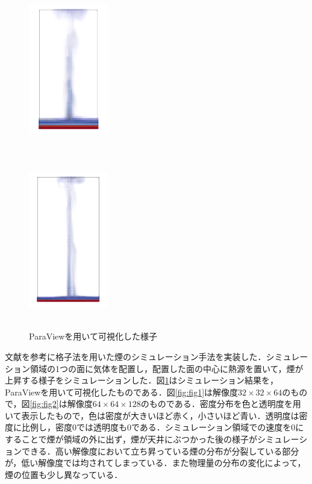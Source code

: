 \documentclass[10pt,a4paper,notitlepage,oneside,twocolumn]{abst_jsarticle}
\begin{document}
\begin{figure}[h]
\begin{minipage}[t]{0.5\linewidth}
  \includegraphics[height=7cm,width=3.5cm]{323264.png}
  \subcaption{}
  \label{fig:fig1}
  \end{minipage}
  \begin{minipage}[t]{0.4\linewidth}
  \includegraphics[height=7cm,width=3.5cm]{6464128.png}
  \subcaption{}
  \label{fig:fig2}
  \end{minipage}
\caption{ParaViewを用いて可視化した様子}
\label{fig}
\end{figure}
文献\cite{fedkiw}を参考に格子法を用いた煙のシミュレーション手法を実装した．シミュレーション領域の1つの面に気体を配置し，配置した面の中心に熱源を置いて，煙が上昇する様子をシミュレーションした．図\ref{fig}はシミュレーション結果を，ParaViewを用いて可視化したものである．図\ref{fig:fig1}は解像度$32\times32\times64$のもので，図\ref{fig:fig2}は解像度$64\times64\times128$のものである．密度分布を色と透明度を用いて表示したもので，色は密度が大きいほど赤く，小さいほど青い．透明度は密度に比例し，密度$0$では透明度も$0$である．シミュレーション領域での速度を0にすることで煙が領域の外に出ず，煙が天井にぶつかった後の様子がシミュレーションできる．高い解像度において立ち昇っている煙の分布が分裂している部分が，低い解像度では均されてしまっている．また物理量の分布の変化によって，煙の位置も少し異なっている．
\end{document}
